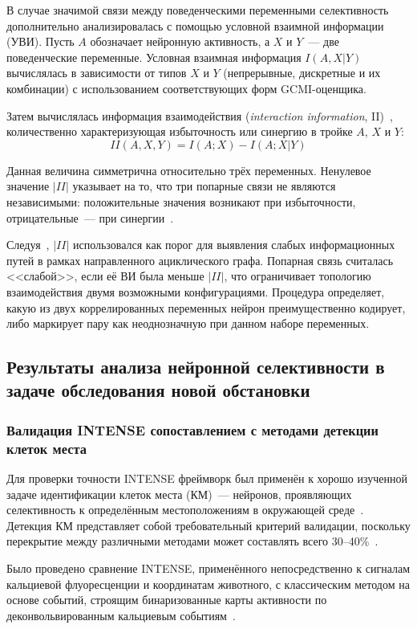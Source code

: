 В случае значимой связи между поведенческими переменными селективность дополнительно анализировалась с помощью условной взаимной информации (УВИ). Пусть $A$ обозначает нейронную активность, а $X$ и $Y$~--- две поведенческие переменные. Условная взаимная информация $I(A,X|Y)$ вычислялась в зависимости от типов $X$ и $Y$ (непрерывные, дискретные и их комбинации) с использованием соответствующих форм GCMI-оценщика.

Затем вычислялась информация взаимодействия (\textit{interaction information}, II)~\cite{McGill1954,ghassami2017}, количественно характеризующая избыточность или синергию в тройке $A$, $X$ и $Y$:
$$II(A,X,Y) = I(A;X) - I(A;X|Y)$$

Данная величина симметрична относительно трёх переменных. Ненулевое значение $|II|$ указывает на то, что три попарные связи не являются независимыми: положительные значения возникают при избыточности, отрицательные~--- при синергии~\cite{Bell2003}.

Следуя~\cite{ghassami2017}, $|II|$ использовался как порог для выявления слабых информационных путей в рамках направленного ациклического графа. Попарная связь считалась <<слабой>>, если её ВИ была меньше $|II|$, что ограничивает топологию взаимодействия двумя возможными конфигурациями. Процедура определяет, какую из двух коррелированных переменных нейрон преимущественно кодирует, либо маркирует пару как неоднозначную при данном наборе переменных.


\subsection{Результаты анализа нейронной селективности в задаче обследования новой обстановки}\label{sec:intense_results}

\subsubsection{Валидация INTENSE сопоставлением с методами детекции клеток места}

Для проверки точности INTENSE фреймворк был применён к хорошо изученной задаче идентификации клеток места (КМ)~--- нейронов, проявляющих селективность к определённым местоположениям в окружающей среде~\cite{o1971hippocampus}. Детекция КМ представляет собой требовательный критерий валидации, поскольку перекрытие между различными методами может составлять всего 30--40\%~\cite{Grijseels2021}.

Было проведено сравнение INTENSE, применённого непосредственно к сигналам кальциевой флуоресценции и координатам животного, с классическим методом на основе событий, строящим бинаризованные карты активности по деконвольвированным кальциевым событиям~\cite{skaggs1993information}.

